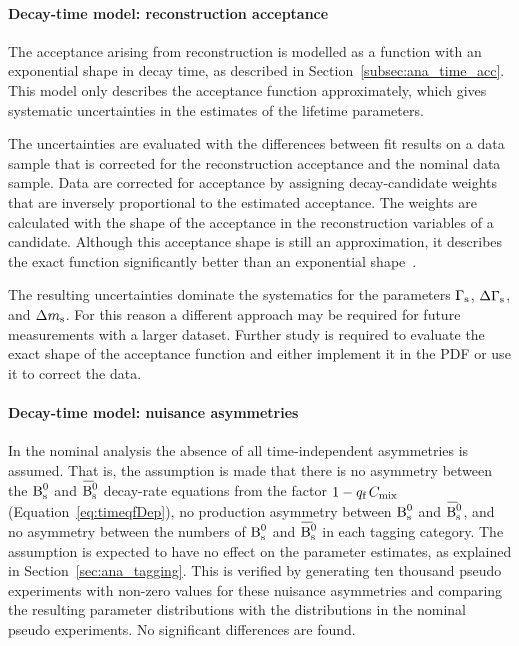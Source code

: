\paragraph{Decay-time model: reconstruction acceptance}
The acceptance arising from reconstruction is modelled as a function with an exponential shape in decay time, as described in
Section~\ref{subsec:ana_time_acc}. This model only describes the acceptance function approximately, which gives systematic uncertainties in
the estimates of the lifetime parameters.

The uncertainties are evaluated with the differences between fit results on a data sample that is corrected for the reconstruction
acceptance and the nominal data sample. Data are corrected for acceptance by assigning decay-candidate weights that are inversely
proportional to the estimated acceptance. The weights are calculated with the shape of the acceptance in the reconstruction variables of a
candidate. Although this acceptance shape is still an approximation, it describes the exact function significantly better than an
exponential shape~\cite{LHCb-ANA-2014-039}.

The resulting uncertainties dominate the systematics for the parameters $\Gamma_\text{s}$, $\Delta\Gamma_\text{s}$, and $\Delta m_\text{s}$. For this reason a different approach may
be required for future measurements with a larger dataset. Further study is required to evaluate the exact shape of the acceptance function
and either implement it in the PDF or use it to correct the data.

\paragraph{Decay-time model: nuisance \BsBsbar{} asymmetries}
In the nominal analysis the absence of all time-independent \BsBsbar{} asymmetries is assumed. That is, the assumption is made that there
is no asymmetry between the $\text{B}_\text{s}^\text{0}$ and $\Bsbar$ decay-rate equations from the factor $1-{q_\text{f}}\,C_\text{mix}$ (Equation~\ref{eq:timeqfDep}), no
production asymmetry between $\text{B}_\text{s}^\text{0}$ and $\Bsbar$, and no asymmetry between the numbers of $\text{B}_\text{s}^\text{0}$ and $\Bsbar$ in each tagging category. The
assumption is expected to have no effect on the parameter estimates, as explained in Section~\ref{sec:ana_tagging}. This is verified by
generating ten thousand pseudo experiments with non-zero values for these nuisance asymmetries and comparing the resulting parameter
distributions with the distributions in the nominal pseudo experiments. No significant differences are found.

